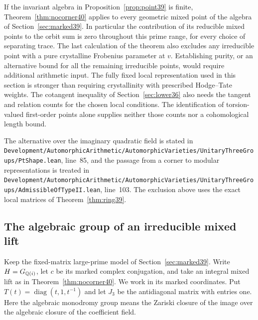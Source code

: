 \documentclass[a4paper,11pt]{article}
\theoremstyle{definition}
\theoremstyle{remark}
\newcommand{\lead}[1]{\par\smallskip\noindent{\bfseries\color{ink}#1.}\enspace}
\newcommand{\srcloc}[2]{{\small\nolinkurl{#1.lean}}, line~#2}
\numberwithin{equation}{section}
\begin{document}
If the invariant algebra in Proposition~\ref{prop:point39} is finite, Theorem~\ref{thm:nocorner40} applies to every geometric mixed point of the algebra of Section~\ref{sec:marked39}. In particular the contribution of its reducible mixed points to the orbit sum is zero throughout this prime range, for every choice of separating trace. The last calculation of the theorem also excludes any irreducible point with a pure crystalline Frobenius parameter at \(v\). Establishing purity, or an alternative bound for all the remaining irreducible points, would require additional arithmetic input. The fully fixed local representation used in this section is stronger than requiring crystallinity with prescribed Hodge--Tate weights. The cotangent inequality of Section~\ref{sec:lower36} also needs the tangent and relation counts for the chosen local conditions. The identification of torsion-valued first-order points alone supplies neither those counts nor a cohomological length bound.

\lead{Locations in the accompanying source} The alternative over the imaginary quadratic field is stated in \srcloc{Development/AutomorphicArithmetic/AutomorphicVarieties/UnitaryThreeGroups/PtShape}{85}, and the passage from a corner to modular representations is treated in \srcloc{Development/AutomorphicArithmetic/AutomorphicVarieties/UnitaryThreeGroups/AdmissibleOfTypeII}{103}. The exclusion above uses the exact local matrices of Theorem~\ref{thm:ring39}.

\subsection{The algebraic group of an irreducible mixed lift}\label{nav:IV-12}
\label{sec:monodromy44}

Keep the fixed-matrix large-prime model of Section~\ref{sec:marked39}. Write \(H=G_{\mathbb Q(i)}\), let \(c\) be its marked complex conjugation, and take an integral mixed lift as in Theorem~\ref{thm:nocorner40}. We work in its marked coordinates. Put \(T(t)=\operatorname{diag}(t,1,t^{-1})\) and let \(J_3\) be the antidiagonal matrix with entries one. Here the algebraic monodromy group means the Zariski closure of the image over the algebraic closure of the coefficient field.
\end{document}
